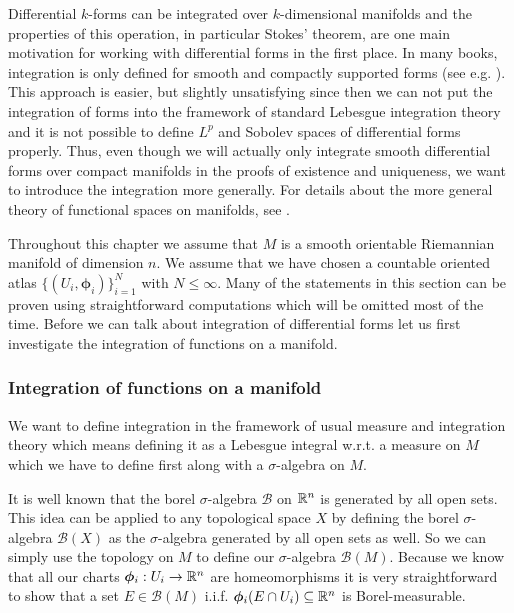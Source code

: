 \documentclass[../master_thesis.tex]{subfiles}
\begin{document}
Differential $k$-forms can be integrated over $k$-dimensional manifolds and 
the properties of this operation, in particular Stokes' theorem, are one main motivation for working with differential 
forms in the first place. In many books, integration is only defined for 
smooth and compactly supported forms (see e.g. \cite[Sec.\,V.3]{topology_and_geometry}). This approach is easier, 
but slightly unsatisfying since then we can not put the integration of forms 
into the framework of standard Lebesgue integration theory and it is not possible 
to define $L^p$ and Sobolev spaces of differential forms properly. Thus, even though we will
actually only integrate smooth differential forms over compact manifolds in the proofs
of existence and uniqueness,
we want to introduce the integration more generally. For details about the 
more general theory of functional spaces on manifolds, see \cite[Sec.\,10.2.4]{nicolaescu}.

Throughout this chapter we assume that $M$ is a smooth orientable Riemannian 
manifold of dimension $n$. We assume that we have chosen a 
countable oriented atlas $\{ (U_i, \boldsymbol{\phi}_i) \}_{i=1}^N$ with $N \leq \infty$. 
Many of the statements in this section can be proven using straightforward computations 
which will be omitted most of the time.
Before we can talk about integration of differential forms let us first 
investigate the integration of functions on a manifold.

\subsubsection{Integration of functions on a manifold}

We want to define integration in the framework of usual measure and integration
theory which means defining it as a Lebesgue integral w.r.t. a measure on $M$
which we have to define first along with a $\sigma$-algebra on $M$. 

It is well known that
the borel $\sigma$-algebra $\mathcal{B}$ on $\mathbb{R}^n$ is generated
by all open sets. This idea can be applied to any topological space $X$ by 
defining the borel $\sigma$-algebra $\mathcal{B}(X)$ as the $\sigma$-algebra 
generated by all open sets as well. So we can simply use the topology on $M$ to define 
our $\sigma$-algebra $\mathcal{B}(M)$. Because we know that all our 
charts $\boldsymbol{\phi}_i: U_i \rightarrow \mathbb{R}^n$ are homeomorphisms it is very 
straightforward to show that a set $E \in \mathcal{B}(M)$ i.i.f.
$\boldsymbol{\phi}_i(E \cap U_i) \subseteq \mathbb{R}^n$ is Borel-measurable. 
\end{document}
